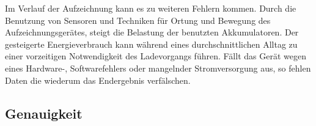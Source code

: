Im Verlauf der Aufzeichnung kann es zu weiteren Fehlern kommen.
Durch die Benutzung von Sensoren und Techniken für Ortung und Bewegung des Aufzeichnungsgerätes, steigt die Belastung der benutzten Akkumulatoren.
Der gesteigerte Energieverbrauch kann während eines durchschnittlichen Alltag zu einer vorzeitigen Notwendigkeit des Ladevorgangs führen.
Fällt das Gerät wegen eines Hardware-, Softwarefehlers oder mangelnder Stromversorgung aus, so fehlen Daten die wiederum das Endergebnis verfälschen.

\subsection{Genauigkeit}
\label{ch:Relativierung:sec:SystematischeUndZufälligeFehler:subsec:Genauigkeit}

